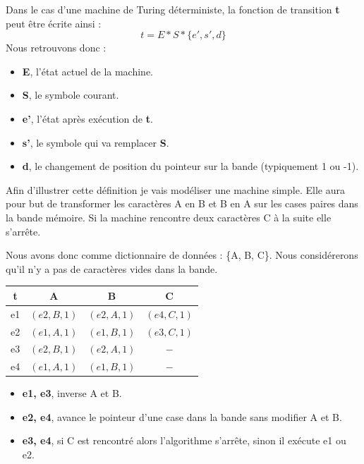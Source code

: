 \documentclass[12pt, twoside, openright]{report}
\begin{document}
Dans le cas d'une machine de Turing déterministe, la fonction de transition \textbf{t} peut être écrite ainsi : 
\[t = E * S * \{e', s', d\}\]
Nous retrouvons donc :
\begin{itemize}
    \item \textbf{E}, l'état actuel de la machine.
    \item \textbf{S}, le symbole courant.
    \item \textbf{e'}, l'état après exécution de \textbf{t}.
    \item \textbf{s'}, le symbole qui va remplacer \textbf{S}.
    \item \textbf{d}, le changement de position du pointeur sur la bande (typiquement 1 ou -1).
\end{itemize}

Afin d'illustrer cette définition je vais modéliser une machine simple. Elle aura pour but de transformer les caractères A en B et B en A sur les cases paires dans la bande mémoire. Si la machine rencontre deux caractères C à la suite elle s'arrête.

Nous avons donc comme dictionnaire de données : \{A, B, C\}. Nous considérerons qu'il n'y a pas de caractères vides dans la bande.

\begin{center}
    \begin{tabular}{|c|c|c|c|}
        \hline 
t        &A  & B & C \\ 
        \hline 
e1        &$(e2, B, 1)$   & $(e2, A, 1)$  & $(e4, C, 1)$  \\ 
        \hline 
e2        & $(e1, A, 1)$  & $(e1, B, 1)$  & $(e3, C, 1)$  \\ 
        \hline 
e3        &$(e2, B, 1)$  & $(e2, A, 1)$  & $-$ \\ 
        \hline 
e4        &$(e1, A, 1)$   & $(e1, B, 1)$  &  $-$\\ 
        \hline 
    \end{tabular}
\end{center}

\begin{itemize}
    \item \textbf{e1, e3}, inverse A et B.
    \item \textbf{e2, e4}, avance le pointeur d'une case dans la bande sans modifier A et B. 
    \item \textbf{e3, e4}, si C est rencontré alors l'algorithme s'arrête, sinon il exécute e1 ou e2.
\end{itemize}
\end{document}
